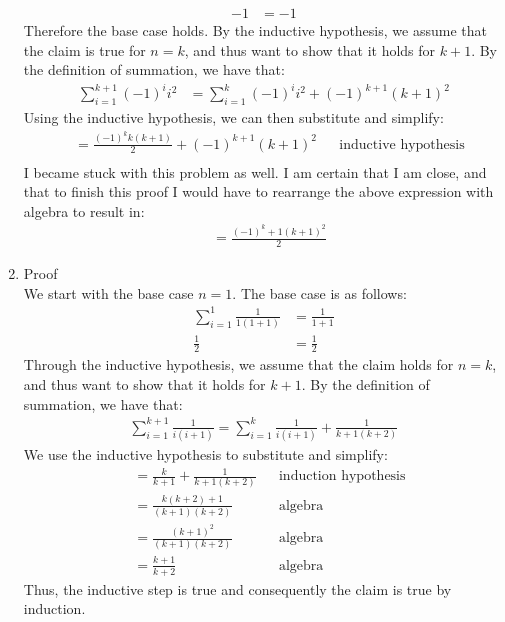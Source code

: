 \documentclass{article}
\begin{document}
\begin{enumerate}
\begin{align}
	-1&=-1
	\end{align}
	Therefore the base case holds. By the inductive hypothesis, we assume that the claim is true for $n=k$, and thus want to show that it holds for $k+1$. By the definition of summation, we have that:
	\begin{align}
	\sum^{k+1}_{i=1}(-1)^ii^2&=\sum^{k}_{i=1}(-1)^ii^2+(-1)^{k+1}(k+1)^2 
	\end{align}
	Using the inductive hypothesis, we can then substitute and simplify:
	\begin{align}
	&=\frac{(-1)^kk(k+1)}{2} +(-1)^{k+1}(k+1)^2 && \text{inductive hypothesis}\\
	\end{align}
	I became stuck with this problem as well. I am certain that I am close, and that to finish this proof I would have to rearrange the above expression with algebra to result in:
	\begin{align}
	&=\frac{(-1)^k+1(k+1)^2}{2}
	\end{align}
	\item Proof \\
	We start with the base case $n=1$. The base case is as follows:
	\begin{align}
	\sum_{i=1}^{1}\frac{1}{1(1+1)}&=\frac{1}{1+1}\\
	\frac{1}{2}&=\frac{1}{2}
	\end{align}
	Through the inductive hypothesis, we assume that the claim holds for $n=k$, and thus want to show that it holds for $k+1$. By the definition of summation, we have that:
	\begin{align}
	\sum_{i=1}^{k+1}\frac{1}{i(i+1)}=\sum_{i=1}^{k}\frac{1}{i(i+1)}+\frac{1}{k+1(k+2)}
	\end{align}
	We use the inductive hypothesis to substitute and simplify:
	\begin{align}
	&=\frac{k}{k+1}+\frac{1}{k+1(k+2)} && \text{induction hypothesis} \\
	&=\frac{k(k+2)+1}{(k+1)(k+2)} && \text{algebra} \\
	&=\frac{(k+1)^2}{(k+1)(k+2)} && \text{algebra}\\
	&=\frac{k+1}{k+2} && \text{algebra}
	\end{align}
	Thus, the inductive step is true and consequently the claim is true by induction.
\end{enumerate}
\end{document}
